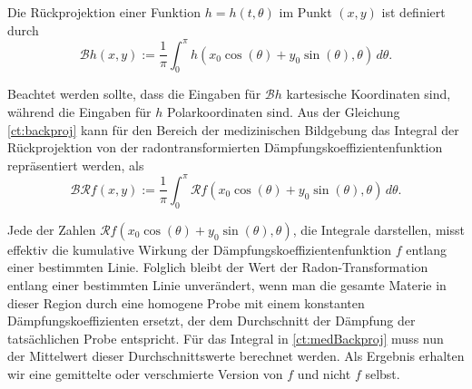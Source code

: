 Die Rückprojektion einer Funktion $h = h(t, \theta)$ im Punkt $(x, y)$ ist definiert durch
\begin{equation}\label{ct:backproj}
	\mathscr{B}h(x, y) := \dfrac{1}{\pi}\int_{0}^{\pi} h(x_0\cos(\theta) + y_0\sin(\theta), \theta) \,d\theta.
\end{equation}

Beachtet werden sollte, dass die Eingaben für $\mathscr{B}h$ kartesische Koordinaten sind, während die Eingaben für $h$ Polarkoordinaten sind.
Aus der Gleichung \eqref{ct:backproj} kann für den Bereich der medizinischen Bildgebung das Integral der Rückprojektion von der radontransformierten Dämpfungskoeffizientenfunktion repräsentiert werden, als
\begin{equation}\label{ct:medBackproj}
	\mathscr{B}\mathscr{R}f(x, y) := \dfrac{1}{\pi}\int_{0}^{\pi} \mathscr{R}f(x_0\cos(\theta) + y_0\sin(\theta), \theta) \,d\theta.
\end{equation}

Jede der Zahlen $\mathscr{R}f(x_0\cos(\theta) + y_0\sin(\theta), \theta)$, die Integrale darstellen, misst effektiv die kumulative Wirkung der Dämpfungskoeffizientenfunktion $f$ entlang einer bestimmten Linie. Folglich bleibt der Wert der Radon-Transformation entlang einer bestimmten Linie unverändert, wenn man die gesamte Materie in dieser Region durch eine homogene Probe mit einem konstanten Dämpfungskoeffizienten ersetzt, der dem Durchschnitt der Dämpfung der tatsächlichen Probe entspricht. Für das Integral in \eqref{ct:medBackproj} muss nun der Mittelwert dieser Durchschnittswerte berechnet werden. Als Ergebnis erhalten wir eine \glqq gemittelte\grqq{} oder \glqq verschmierte\grqq{} Version von $f$ und nicht $f$ selbst.

